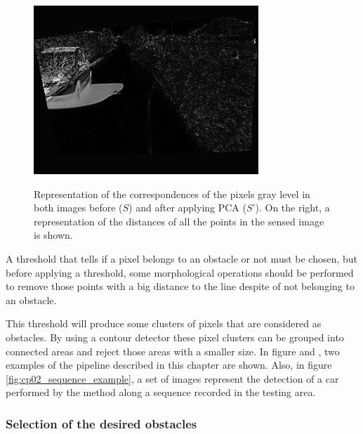 \begin{figure}[h!]
\begin{minipage}{0.3\textwidth}
\end{minipage}
\begin{minipage}{0.3\textwidth}
    \centering
    \includegraphics[width=\textwidth]{pca3}\label{fig:cp02_pca3}
\end{minipage}
\caption{Representation of the correspondences of the pixels gray level in both images before ($S$) and after applying PCA ($S’$). On the right, a representation of the distances of all the points in the sensed image is shown.}\label{fig:cp02_pca}
\end{figure}

A threshold that tells if a pixel belongs to an obstacle or not must be chosen, but before applying a threshold, some morphological operations should be performed to remove those points with a big distance to the line despite of not belonging to an obstacle.

This threshold will produce some clusters of pixels that are considered as obstacles. By using a contour detector these pixel clusters can be grouped into connected areas and reject those areas with a smaller size. In figure  and , two examples of the pipeline described in this chapter are shown. Also, in figure \ref{fig:cp02_sequence_example}, a set of images represent the detection of a car performed by the method along a sequence recorded in the testing area.

\subsubsection{Selection of the desired obstacles}\label{ch:chapter02_01_03_03}

